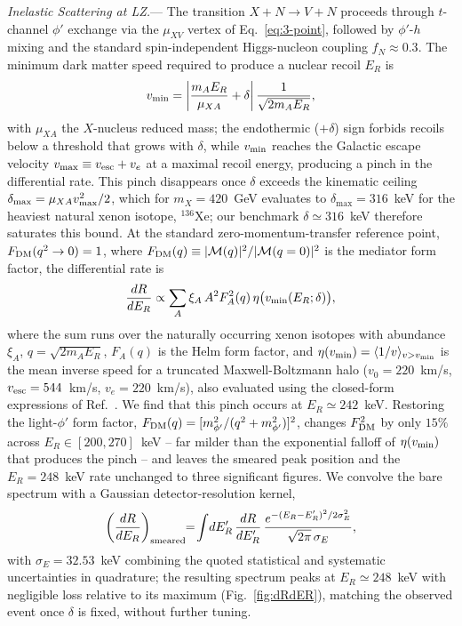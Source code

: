 \documentclass[aps,prl,twocolumn,superscriptaddress,nofootinbib]{revtex4-2}
\begin{document}
\textit{Inelastic Scattering at LZ.}---%
The transition $X+N\to V+N$ proceeds through $t$-channel $\phi'$
exchange via the $\mu_{XV}$ vertex of Eq.~\eqref{eq:3-point}, followed
by $\phi'$-$h$ mixing and the standard spin-independent Higgs-nucleon
coupling $f_N\approx0.3$. The minimum dark matter speed required to
produce a nuclear recoil $E_R$ is~\cite{TuckerSmith2001}
\begin{equation}
v_{\rm min}=\left|\frac{m_A E_R}{\mu_{XA}}+\delta\right|
\frac{1}{\sqrt{2m_AE_R}},
\label{eq:vmin}
\end{equation}
with $\mu_{XA}$ the $X$-nucleus reduced mass; the endothermic ($+\delta$)
sign forbids recoils below a threshold that grows with $\delta$, while
$v_{\rm min}$ reaches the Galactic escape velocity
$v_{\rm max}\equiv v_{\rm esc}+v_e$ at a maximal recoil energy,
producing a pinch in the differential rate. This pinch disappears once
$\delta$ exceeds the kinematic ceiling
$\delta_{\max}=\mu_{XA}v_{\rm max}^2/2$, which for $m_X=420$~GeV
evaluates to $\delta_{\max}=316$~keV for the heaviest natural xenon
isotope, $^{136}$Xe; our benchmark $\delta\simeq316$~keV therefore
saturates this bound. At the standard zero-momentum-transfer reference
point, $F_{\rm DM}(q^2\to0)=1$, where
$F_{\rm DM}(q)\equiv|\mathcal{M}(q)|^2/|\mathcal{M}(q=0)|^2$ is the
mediator form factor, the differential rate is~\cite{LewinSmith1996}
\begin{equation}
\frac{dR}{dE_R}\propto\sum_{A}\xi_A\,A^2F_A^2(q)\,
\eta\big(v_{\rm min}(E_R;\delta)\big),
\end{equation}
where the sum runs over the naturally occurring xenon isotopes with
abundance $\xi_A$, $q=\sqrt{2m_AE_R}$, $F_A(q)$ is the Helm form
factor, and $\eta(v_{\rm min})=\langle1/v\rangle_{v>v_{\rm min}}$ is the
mean inverse speed for a truncated Maxwell-Boltzmann halo
($v_0=220$~km/s, $v_{\rm esc}=544$~km/s, $v_e=220$~km/s), also evaluated
using the closed-form expressions of Ref.~\cite{LewinSmith1996}. We find
that this pinch occurs at $E_R\simeq242$~keV. Restoring the
light-$\phi'$ form factor, $F_{\rm DM}(q)=[m_{\phi'}^2/(q^2+m_{\phi'}^2)]^2$,
changes
$F_{\rm DM}^2$ by only $15\%$ across $E_R\in[200,270]$~keV -- far
milder than the exponential falloff of $\eta(v_{\rm min})$ that
produces the pinch -- and leaves the smeared peak position and the
$E_R=248$~keV rate unchanged to three significant figures. We convolve
the bare spectrum with a Gaussian detector-resolution kernel,
\begin{equation}
\left(\frac{dR}{dE_R}\right)_{\rm smeared}\!\!=\!\int\! dE_R'\,
\frac{dR}{dE_R'}\,\frac{e^{-(E_R-E_R')^2/2\sigma_E^2}}{\sqrt{2\pi}\,\sigma_E},
\end{equation}
with $\sigma_E=32.53$~keV combining the quoted statistical and
systematic uncertainties in quadrature; the resulting spectrum peaks at
$E_R\simeq248$~keV with negligible loss relative to its maximum
(Fig.~\ref{fig:dRdER}), matching the observed event once $\delta$ is
fixed, without further tuning.
\end{document}
